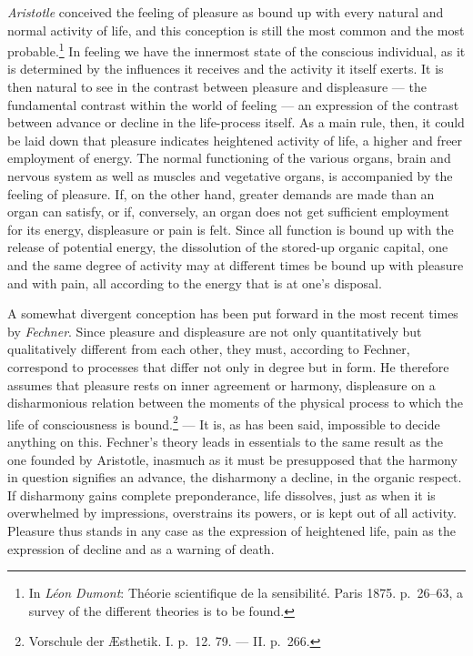 \documentclass[12pt,a4paper]{book}
\newcommand{\opage}[1]{\marginnote{\footnotesize\textit{[#1]}}}
\begin{document}
\emph{Aristotle} conceived the feeling of pleasure as bound up with
every natural and normal activity of life, and this conception is still
the most common and the most probable.\footnote{In \emph{Léon Dumont}:
Théorie scientifique de la sensibilité. Paris 1875. p.~26--63, a survey
of the different theories is to be found.} In feeling we have the
innermost state of the conscious individual, as it is determined by the
influences it receives and the activity it itself exerts. It is then
natural to see in the contrast between pleasure and displeasure --- the
fundamental contrast within the world of feeling --- an expression of
the contrast between advance or decline in the life-process itself. As
a main rule, then, it could be laid down that pleasure indicates
heightened activity of life, a higher and freer employment of energy.
The normal functioning of the various organs, brain and nervous system
as well as muscles and vegetative organs, is accompanied by the feeling
of pleasure. If, on the other hand, greater demands are made than an
organ can satisfy, or if, conversely, an organ does not get sufficient
employment for its energy, displeasure or pain is felt. Since all
function is bound up with the release of potential energy, the
dissolution of the stored-up organic capital,
\opage{323}one and the same degree of activity may at different times be
bound up with pleasure and with pain, all according to the energy that
is at one's disposal.

A somewhat divergent conception has been put forward in the most recent
times by \emph{Fechner}. Since pleasure and displeasure are not only
quantitatively but qualitatively different from each other, they must,
according to Fechner, correspond to processes that differ not only in
degree but in form. He therefore assumes that pleasure rests on inner
agreement or harmony, displeasure on a disharmonious relation between
the moments of the physical process to which the life of consciousness
is bound.\footnote{Vorschule der Æsthetik. I. p.~12. 79. --- II.
p.~266.} --- It is, as has been said, impossible to decide anything on
this. Fechner's theory leads in essentials to the same result as the one
founded by Aristotle, inasmuch as it must be presupposed that the
harmony in question signifies an advance, the disharmony a decline, in
the organic respect. If disharmony gains complete preponderance, life
dissolves, just as when it is overwhelmed by impressions, overstrains
its powers, or is kept out of all activity. Pleasure thus stands in any
case as the expression of heightened life, pain as the expression of
decline and as a warning of death.
\end{document}
